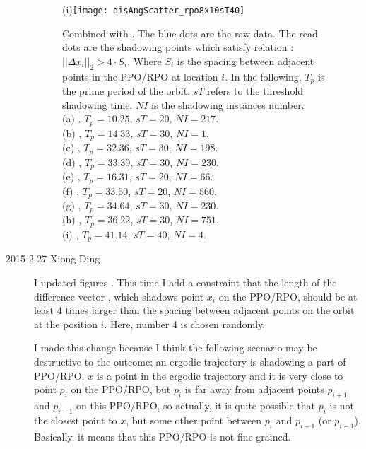 \begin{description}
 \begin{figure}[h]
   \centering
   (i)\texttt{[image: disAngScatter\_rpo8x10sT40]}
   \caption{Combined with .
     The blue dots are the raw data. The read dots are the shadowing
     points which satisfy relation :
     $||\Delta x_i||_2 > 4 \cdot S_i$. Where $S_i$ is the spacing between
     adjacent points in the PPO/RPO at location $i$.
     In the following,
     $T_p$ is the prime period of the orbit.
     $sT$ refers to the threshold shadowing time. $NI$ is the shadowing
     instances number. \\
     (a) , $T_p = 10.25$, $sT=20$, $NI=217$. \\
     (b) , $T_p = 14.33$, $sT=30$, $NI=1$.   \\
     (c) , $T_p = 32.36$, $sT=30$, $NI=198$. \\
     (d) , $T_p = 33.39$, $sT=30$, $NI=230$. \\
     (e) , $T_p = 16.31$, $sT=20$, $NI=66$.  \\
     (f) , $T_p = 33.50$, $sT=20$, $NI=560$. \\
     (g) , $T_p = 34.64$, $sT=30$, $NI=230$. \\
     (h) , $T_p = 36.22$, $sT=30$, $NI=751$. \\
     (i) , $T_p = 41.14$, $sT=40$, $NI=4$.   \\
   }
   \label{fig:disAngScatterN32_2}
  \end{figure}


\item[2015-2-27 Xiong Ding]
I updated figures  
 .
This time I add a constraint that the length of the difference vector
, which shadows point $x_i$ on the PPO/RPO, should be at least 4 times
larger than the spacing between adjacent points on the orbit at the
position $i$. Here, number 4 is chosen randomly.

I made this change because I think
the following scenario may be destructive
to the outcome: an ergodic trajectory is shadowing a part of PPO/RPO.
$x$ is a point in the ergodic trajectory and it is very close to
point $p_i$ on the PPO/RPO, but $p_i$ is far away from adjacent
points $p_{i+1}$ and $p_{i-1}$ on this
PPO/RPO, so actually, it is quite possible that $p_{i}$ is not the closest
point to $x$, but some other point between $p_i$ and $p_{i+1}$
(or $p_{i-1}$). Basically, it means that this PPO/RPO is not fine-grained.


\end{description}
